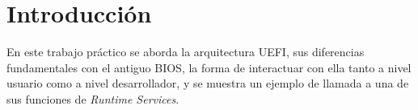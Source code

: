 \section{Introducción}

En este trabajo práctico se aborda la arquitectura UEFI, sus diferencias fundamentales
con el antiguo BIOS, la forma de interactuar con ella tanto a nivel usuario como a
nivel desarrollador, y se muestra un ejemplo de llamada a una de sus funciones de
\emph{Runtime Services}.
